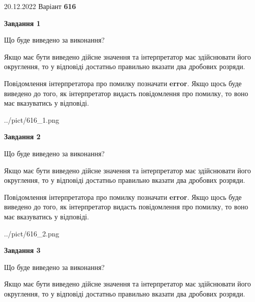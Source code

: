 \documentclass[12pt, ukrainian]{article}
\begin{document}
{20.12.2022 Варіант \No \textbf { 616 }\par}
{
\begin {Large}

{\begin {center}\textbf{Завдання 1}\end {center}}\par
Що буде виведено за виконання? \par

Якщо має бути виведено дійсне значення та інтерпретатор має здійснювати його округлення, 
то у відповіді достатньо правильно вказати два дробових розряди.

Повідомлення інтерпретатора про помилку позначати \textbf{error}.
Якщо щось буде виведено до того, як інтерпретатор видасть повідомлення про помилку, 
то воно має вказуватись у відповіді. \par

\begin{center}
	{../pict/616_1.png}
\end{center}
\newpage

{\begin {center}\textbf{Завдання 2}\end {center}}\par
Що буде виведено за виконання? \par

Якщо має бути виведено дійсне значення та інтерпретатор має здійснювати його округлення, 
то у відповіді достатньо правильно вказати два дробових розряди.

Повідомлення інтерпретатора про помилку позначати \textbf{error}.
Якщо щось буде виведено до того, як інтерпретатор видасть повідомлення про помилку, 
то воно має вказуватись у відповіді. \par

\begin{center}
	{../pict/616_2.png}
\end{center}
\newpage

{\begin {center}\textbf{Завдання 3}\end {center}}\par
Що буде виведено за виконання? \par

Якщо має бути виведено дійсне значення та інтерпретатор має здійснювати його округлення, 
то у відповіді достатньо правильно вказати два дробових розряди.


\end{Large}}
\end{document}
